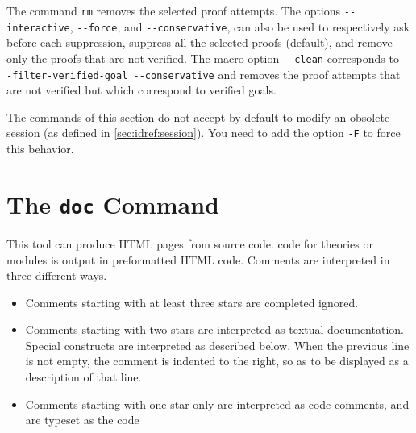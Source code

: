 The command \texttt{rm} removes the selected proof
attempts. The options \verb|--interactive|, \verb|--force|, and
\verb|--conservative|, can also be used to respectively ask before
each suppression, suppress all the selected proofs (default), and remove
only the proofs that are not verified. The macro option \verb|--clean|
corresponds to \verb|--filter-verified-goal --conservative| and
removes the proof attempts that are not verified but which correspond
to verified goals.

The commands of this section do not accept by default to modify an
obsolete session (as defined in \ref{sec:idref:session}). You need to
add the option \verb|-F| to force this behavior.






\section{The \texttt{doc} Command}
\label{sec:why3doc}

This tool can produce HTML pages from \why source code.
\why code for theories or modules is output in
preformatted HTML code. Comments are interpreted in three different ways.
\begin{itemize}
\item Comments starting with at least three stars are completed
  ignored.
\item Comments starting with two stars are interpreted as textual
  documentation. Special constructs are interpreted as described
  below. When the previous line is not empty, the comment is indented to
  the right, so as to be displayed as a description of that line.
\item Comments starting with one star only are interpreted as code
  comments, and are typeset as the code
\end{itemize}

